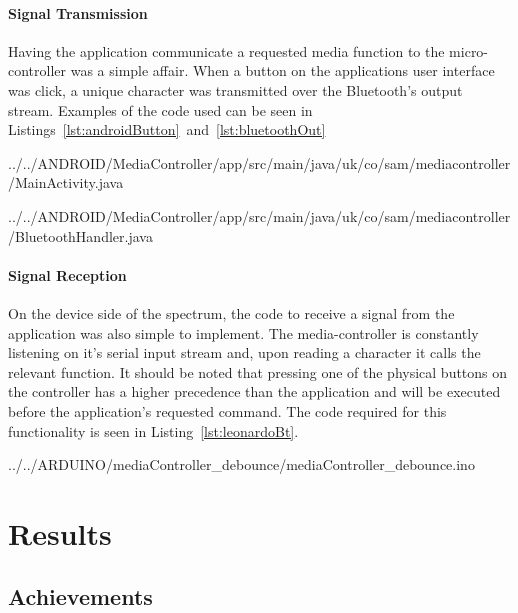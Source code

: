 \documentclass{article}
\begin{document}
			\paragraph{Signal Transmission}
			Having the application communicate a requested media function to the micro-controller was a simple affair. When a button on the applications user interface was click, a unique character was transmitted over the Bluetooth's output stream. Examples of the code used can be seen in Listings~\ref{lst:androidButton}~and~\ref{lst:bluetoothOut}
			
			 {../../ANDROID/MediaController/app/src/main/java/uk/co/sam/mediacontroller/MainActivity.java}
			
			 {../../ANDROID/MediaController/app/src/main/java/uk/co/sam/mediacontroller/BluetoothHandler.java}
			
			\paragraph{Signal Reception}
			On the device side of the spectrum, the code to receive a signal from the application was also simple to implement. The media-controller is constantly listening on it's serial input stream and, upon reading a character it calls the relevant function. It should be noted that pressing one of the physical buttons on the controller has a higher precedence than the application and will be executed before the application's requested command. The code required for this functionality is seen in Listing~\ref{lst:leonardoBt}.
			
			 {../../ARDUINO/mediaController_debounce/mediaController_debounce.ino}
			
	\section{Results}
		\subsection{Achievements}
			\lipsum[1]
			
\end{document}

